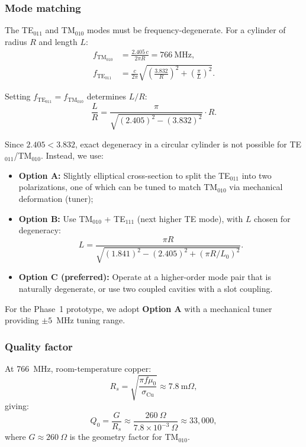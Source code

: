 \documentclass[12pt,letterpaper]{article}
\begin{document}
\subsubsection{Mode matching}

The TE$_{011}$ and TM$_{010}$ modes must be frequency-degenerate.
For a cylinder of radius $R$ and length $L$:
\begin{align}
  f_{\text{TM}_{010}} &= \frac{2.405\,c}{2\pi R} = 766~\text{MHz}, \\
  f_{\text{TE}_{011}} &= \frac{c}{2\pi}\sqrt{\left(\frac{3.832}{R}\right)^2
    + \left(\frac{\pi}{L}\right)^2}.
\end{align}

Setting $f_{\text{TE}_{011}} = f_{\text{TM}_{010}}$ determines $L/R$:
\begin{equation}
  \frac{L}{R} = \frac{\pi}{\sqrt{(2.405)^2 - (3.832)^2}} \cdot R.
\end{equation}

Since $2.405 < 3.832$, exact degeneracy in a circular cylinder is not
possible for TE$_{011}$/TM$_{010}$.  Instead, we use:
\begin{itemize}[noitemsep]
  \item \textbf{Option A:} Slightly elliptical cross-section to split
    the TE$_{011}$ into two polarizations, one of which can be tuned
    to match TM$_{010}$ via mechanical deformation (tuner);
  \item \textbf{Option B:} Use TM$_{010}$ + TE$_{111}$ (next higher
    TE mode), with $L$ chosen for degeneracy:
    \begin{equation}
      L = \frac{\pi R}{\sqrt{(1.841)^2 - (2.405)^2 + (\pi R/L_0)^2}}.
    \end{equation}
  \item \textbf{Option C (preferred):} Operate at a higher-order mode
    pair that is naturally degenerate, or use two coupled cavities
    with a slot coupling.
\end{itemize}

For the Phase~1 prototype, we adopt \textbf{Option A} with a
mechanical tuner providing $\pm 5$~MHz tuning range.

\subsubsection{Quality factor}

At 766~MHz, room-temperature copper:
\begin{equation}
  R_s = \sqrt{\frac{\pi f \mu_0}{\sigma_{\text{Cu}}}}
  \approx 7.8~\text{m}\Omega,
\end{equation}
giving:
\begin{equation}
  Q_0 = \frac{G}{R_s} \approx \frac{260~\Omega}{7.8\times 10^{-3}~\Omega}
  \approx 33{,}000,
\end{equation}
where $G \approx 260~\Omega$ is the geometry factor for TM$_{010}$.
\end{document}
